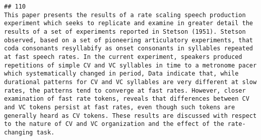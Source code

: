 \documentclass[
  english,
  man]{apa6}
\begin{document}
\begin{verbatim}
## 110                                                                                                                                                                                                                                                                                                                                                                                                                                                                                                                                                                                                                                                                                                                                                                                                                                                                                                                                                                                                                                                                                                                                                                                                                                                                                                                                                                                                                                                                                                                                                                                                                                                          This paper presents the results of a rate scaling speech production experiment which seeks to replicate and examine in greater detail the results of a set of experiments reported in Stetson (1951). Stetson observed, based on a set of pioneering articulatory experiments, that coda consonants resyllabify as onset consonants in syllables repeated at fast speech rates. In the current experiment, speakers produced repetitions of simple CV and VC syllables in time to a metronome pacer which systematically changed in period, Data indicate that, while durational patterns for CV and VC syllables are very different at slow rates, the patterns tend to converge at fast rates. However, closer examination of fast rate tokens, reveals that differences between CV and VC tokens persist at fast rates, even though such tokens are generally heard as CV tokens. These results are discussed with respect to the nature of CV and VC organization and the effect of the rate-changing task.

\end{verbatim}
\end{document}
